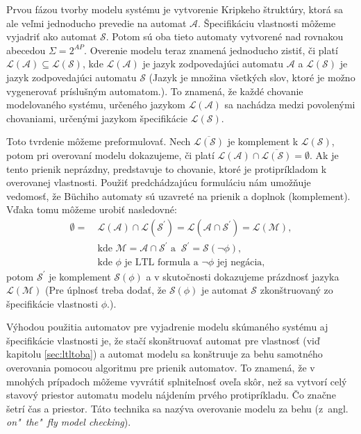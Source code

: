 \documentclass[11pt,final,oneside]{fithesis}
\begin{document}
Prvou f\'azou tvorby modelu syst\'emu je vytvorenie Kripkeho \v strukt\'ury, ktor\'a sa ale ve\v lmi jednoducho prevedie na automat $\mathcal{A}$. 
\v Specifik\'aciu vlastnosti m\^ o\v zeme vyjadri\v t ako automat $\mathcal{S}$. Potom s\'u oba tieto automaty vytvoren\'e nad rovnakou abecedou 
$\Sigma = 2^{AP}$. Overenie modelu teraz znamen\'a jednoducho zisti\v t, \v ci plat\'i $\mathcal{L(A)} \subseteq \mathcal{L(S)}$, kde $\mathcal{L(A)}$ je 
jazyk zodpovedaj\'uci automatu $\mathcal{A}$ a 
$\mathcal{L(S)}$ je jazyk zodpovedaj\'uci automatu $\mathcal{S}$ (Jazyk je mno\v zina v\v setk\'ych slov, ktor\'e je mo\v zno vygenerova\v t 
pr\'islu\v sn\'ym automatom.). To znamen\'a, \v ze ka\v zd\'e chovanie modelovan\'eho syst\'emu, ur\v cen\'eho jazykom $\mathcal{L(A)}$ sa nach\'adza medzi
povolen\'ymi chovaniami, ur\v cen\'ymi jazykom \v specifik\'acie $\mathcal{L(S)}$.

Toto tvrdenie m\^ o\v zeme preformulova\v t. Nech $\overline{\mathcal{L(S)}}$ je komplement k $\mathcal{L(S)}$, potom pri overovan\'i modelu dokazujeme, \v ci
plat\'i $\mathcal{L(A)} \cap \overline{\mathcal{L(S)}} = \emptyset$. Ak je tento prienik nepr\'azdny, predstavuje to chovanie, ktor\'e je protipr\'ikladom 
k overovanej vlastnosti. Pou\v zi\v t predch\'adzaj\'ucu formul\'aciu n\'am umo\v z\v nuje vedomos\v t, \v ze B\"uchiho automaty s\'u uzavret\'e na prienik
a doplnok (komplement). V\v daka tomu m\^ o\v zeme urobi\v t nasledovn\'e:
\begin{align*}
\emptyset =\ &\mathcal{L(A)} \cap \mathcal{L(S^{'})} = \mathcal{L(A \cap S^{'})} = \mathcal{L(M)},\\
&\textrm{kde } \mathcal{M} = \mathcal{A \cap S^{'}} \textrm{ a }\ \mathcal{S^{'}}= \mathcal{S(\neg\phi)},\\
&\textrm{kde } \mathcal{\phi} \textrm{ je LTL formula a } \mathcal{\neg\phi} \textrm{ jej neg\'acia},
\end{align*}
potom $\mathcal{S^{'}}$ je komplement $\mathcal{S(\phi)}$ a v skuto\v cnosti dokazujeme pr\'azdnos\v t jazyka $\mathcal{L(M)}$ 
(Pre \'uplnos\v t treba doda\v t, \v ze $\mathcal{S(\phi)}$ je automat $\mathcal{S}$ zkon\v struovan\'y zo \v specifik\'acie vlastnosti $\phi$.).

V\'yhodou pou\v zitia automatov pre vyjadrenie modelu sk\'uman\'eho syst\'emu aj  \v specifik\'acie vlastnosti je, \v ze sta\v c\'i skon\v struova\v t automat
pre vlastnos\v t (vi\v d kapitolu \ref{sec:ltltoba}) a automat modelu sa kon\v struuje za behu samotn\'eho overovania pomocou algoritmu pre prienik automatov. 
To znamen\'a, \v ze v mnoh\'ych pr\'ipadoch m\^ o\v zeme vyvr\'ati\v t splnite\v lnos\v t ove\v la sk\^ or, ne\v z sa vytvor\'i cel\'y stavov\'y priestor
automatu modelu n\'ajden\'im prv\'eho protipr\'ikladu. \v Co zna\v cne \v setr\'i \v cas a priestor. T\'ato technika sa naz\'yva overovanie modelu za behu 
(z~angl. \textit{on"~the"~fly model checking}).
\cite{Clarke:MC:BA}
\end{document}
